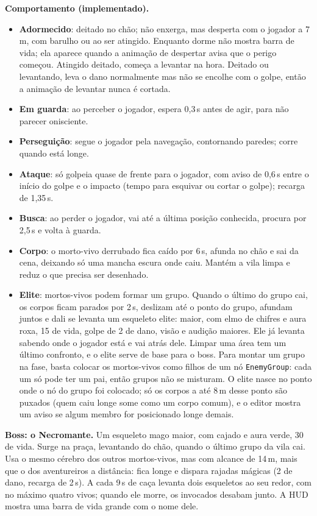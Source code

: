 \documentclass[11pt,a4paper]{article}
\begin{document}
\textbf{Comportamento (implementado).}
\begin{itemize}
    \item \textbf{Adormecido}: deitado no chão; não enxerga, mas desperta com o jogador a 7\,m, com barulho ou ao ser atingido. Enquanto dorme não mostra barra de vida; ela aparece quando a animação de despertar avisa que o perigo começou. Atingido deitado, começa a levantar na hora. Deitado ou levantando, leva o dano normalmente mas não se encolhe com o golpe, então a animação de levantar nunca é cortada.
    \item \textbf{Em guarda}: ao perceber o jogador, espera 0,3\,s antes de agir, para não parecer onisciente.
    \item \textbf{Perseguição}: segue o jogador pela navegação, contornando paredes; corre quando está longe.
    \item \textbf{Ataque}: só golpeia quase de frente para o jogador, com aviso de 0,6\,s entre o início do golpe e o impacto (tempo para esquivar ou cortar o golpe); recarga de 1,35\,s.
    \item \textbf{Busca}: ao perder o jogador, vai até a última posição conhecida, procura por 2,5\,s e volta à guarda.
    \item \textbf{Corpo}: o morto-vivo derrubado fica caído por 6\,s, afunda no chão e sai da cena, deixando só uma mancha escura onde caiu. Mantém a vila limpa e reduz o que precisa ser desenhado.
    \item \textbf{Elite}: mortos-vivos podem formar um grupo. Quando o último do grupo cai, os corpos ficam parados por 2\,s, deslizam até o ponto do grupo, afundam juntos e dali se levanta um esqueleto elite: maior, com elmo de chifres e aura roxa, 15 de vida, golpe de 2 de dano, visão e audição maiores. Ele já levanta sabendo onde o jogador está e vai atrás dele. Limpar uma área tem um último confronto, e o elite serve de base para o boss. Para montar um grupo na fase, basta colocar os mortos-vivos como filhos de um nó \texttt{EnemyGroup}: cada um só pode ter um pai, então grupos não se misturam. O elite nasce no ponto onde o nó do grupo foi colocado; só os corpos a até 8\,m desse ponto são puxados (quem caiu longe some como um corpo comum), e o editor mostra um aviso se algum membro for posicionado longe demais.
\end{itemize}

\textbf{Boss: o Necromante.} Um esqueleto mago maior, com cajado e aura verde, 30 de vida. Surge na praça, levantando do chão, quando o último grupo da vila cai. Usa o mesmo cérebro dos outros mortos-vivos, mas com alcance de 14\,m, mais que o dos aventureiros a distância: fica longe e dispara rajadas mágicas (2 de dano, recarga de 2\,s). A cada 9\,s de caça levanta dois esqueletos ao seu redor, com no máximo quatro vivos; quando ele morre, os invocados desabam junto. A HUD mostra uma barra de vida grande com o nome dele.
\end{document}
